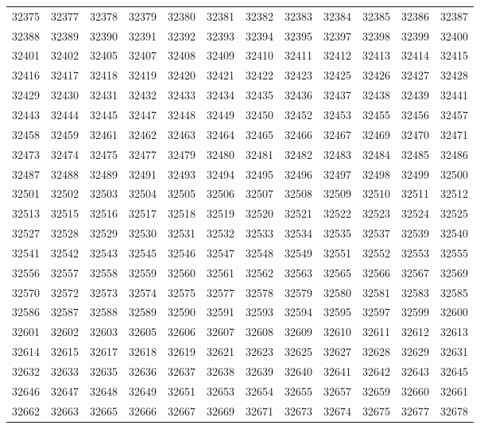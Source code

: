 \begin{center}
\begin{longtable}{llllllllllll}
32375 &32377 &32378 &32379 &32380 &32381 &32382 &32383 &32384 &32385 &32386 &32387 \\
32388 &32389 &32390 &32391 &32392 &32393 &32394 &32395 &32397 &32398 &32399 &32400 \\
32401 &32402 &32405 &32407 &32408 &32409 &32410 &32411 &32412 &32413 &32414 &32415 \\
32416 &32417 &32418 &32419 &32420 &32421 &32422 &32423 &32425 &32426 &32427 &32428 \\
32429 &32430 &32431 &32432 &32433 &32434 &32435 &32436 &32437 &32438 &32439 &32441 \\
32443 &32444 &32445 &32447 &32448 &32449 &32450 &32452 &32453 &32455 &32456 &32457 \\
32458 &32459 &32461 &32462 &32463 &32464 &32465 &32466 &32467 &32469 &32470 &32471 \\
32473 &32474 &32475 &32477 &32479 &32480 &32481 &32482 &32483 &32484 &32485 &32486 \\
32487 &32488 &32489 &32491 &32493 &32494 &32495 &32496 &32497 &32498 &32499 &32500 \\
32501 &32502 &32503 &32504 &32505 &32506 &32507 &32508 &32509 &32510 &32511 &32512 \\
32513 &32515 &32516 &32517 &32518 &32519 &32520 &32521 &32522 &32523 &32524 &32525 \\
32527 &32528 &32529 &32530 &32531 &32532 &32533 &32534 &32535 &32537 &32539 &32540 \\
32541 &32542 &32543 &32545 &32546 &32547 &32548 &32549 &32551 &32552 &32553 &32555 \\
32556 &32557 &32558 &32559 &32560 &32561 &32562 &32563 &32565 &32566 &32567 &32569 \\
32570 &32572 &32573 &32574 &32575 &32577 &32578 &32579 &32580 &32581 &32583 &32585 \\
32586 &32587 &32588 &32589 &32590 &32591 &32593 &32594 &32595 &32597 &32599 &32600 \\
32601 &32602 &32603 &32605 &32606 &32607 &32608 &32609 &32610 &32611 &32612 &32613 \\
32614 &32615 &32617 &32618 &32619 &32621 &32623 &32625 &32627 &32628 &32629 &32631 \\
32632 &32633 &32635 &32636 &32637 &32638 &32639 &32640 &32641 &32642 &32643 &32645 \\
32646 &32647 &32648 &32649 &32651 &32653 &32654 &32655 &32657 &32659 &32660 &32661 \\
32662 &32663 &32665 &32666 &32667 &32669 &32671 &32673 &32674 &32675 &32677 &32678 \\

\end{longtable}
\end{center}
